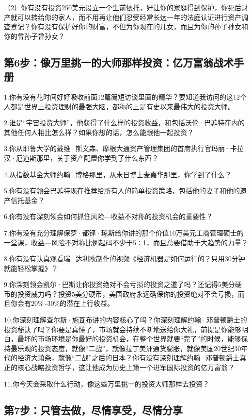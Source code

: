 （2）你有没有投资250美元设立一个生前依托，好让你的家庭得到保护，你死后财产就可以转给你的家人，而不用再让他们忍受经常长达一年的法庭认证进行资产调查登记？你有没有保护好你的财富，不但为你现在的儿女，而且为你的孙子孙女和你的曾孙子曾孙女？

\subsection{第6步：像万里挑一的大师那样投资：亿万富翁战术手册}

1.你有没有花时间好好吸收前面12篇简短访谈里面的精华？要知道我访问的这12个人都是世界上投资理财的最强大脑，都称的上是有史以来最伟大的投资大师。

2.谁是“宇宙投资大师”，他获得了什么样的投资收益，和包括沃伦·巴菲特在内的其他任何人相比怎么样？如果你想的话，怎么能跟他一起投资？

3.你从耶鲁大学的戴维·斯文森、摩根大通资产管理集团的首席执行官玛丽·卡拉汉·厄道斯那里，关于资产配置你学到了什么东西？

4.从指数基金大师约翰·博格那里，从末日博士麦嘉华那里，你学到了什么？

5.你有没有领会巴菲特现在推荐给所有人的简单投资策略，包括他的妻子和他的遗产信托基金？

6.你有没有深刻领会如何抓住风险—收益不对称的投资机会的重要性？

7.你有没有充分理解保罗·都铎·琼斯给你讲的那个价值10万美元工商管理硕士的一堂课，收益—风险不对称比例起码不少于5∶1，而且总要借助于大趋势的力量？

8.你有没有认真观看瑞·达利欧制作的视频《经济机器是如何运行的？只用30分钟就能轻松掌握》？

9.你深刻领会凯尔·巴斯让你投资绝对不会亏损的投资之道了吗？还记得5美分硬币的投资威力吗？投资5美分硬币，美国政府永远确保你的投资绝对不会亏损，而且你会有20\%\textasciitilde{}30\%的潜在上行收益。

10.你深刻理解查尔斯·施瓦布讲的内容核心了吗？你深刻理解约翰·邓普顿爵士的投资秘诀了吗？你要是真懂了，市场就会持续不断地送给你大礼，前提是你能够明白，最坏的市场环境是你最好的投资机会，在整个世界就要“完了”的时候，能够保持最乐观的投资态度，就像“二战”，就像拉丁美洲通货膨胀，就像美国20世纪30年代的经济大萧条，就像“二战”之后的日本？你有没有深刻理解约翰·邓普顿爵士真正的核心战略投资哲学，这让他成为历史上第一个进军国际投资的亿万富翁？

11.你今天会采取什么行动，像这些万里挑一的投资大师那样去投资？

\subsection{第7步：只管去做，尽情享受，尽情分享}

